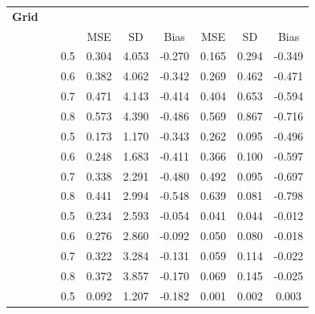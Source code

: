 \documentclass{article}[11pt]
\begin{document}
\begin{table}[ht!]
\centering
{\linespread{1.0}\small\selectfont
\setlength{\tabcolsep}{4.5pt}
\begin{tabular}{l c c ccc ccc}
    \toprule
    \textbf{Grid} & \textbf{} & \textbf{} &  &  \\
    \cmidrule(lr){4-6} \cmidrule(lr){7-9}
    & & & MSE & SD & Bias & MSE & SD & Bias \\
    \midrule
     &  & 0.5 & 0.304 & 4.053 & -0.270 & 0.165 & 0.294 & -0.349 \\
    & & 0.6 & 0.382 & 4.062 & -0.342 & 0.269 & 0.462 & -0.471 \\
    & & 0.7 & 0.471 & 4.143 & -0.414 & 0.404 & 0.653 & -0.594 \\
    & & 0.8 & 0.573 & 4.390 & -0.486 & 0.569 & 0.867 & -0.716 \\
    \cmidrule(lr){2-9}
    &  & 0.5 & 0.173 & 1.170 & -0.343 & 0.262 & 0.095 & -0.496 \\
    & & 0.6 & 0.248 & 1.683 & -0.411 & 0.366 & 0.100 & -0.597 \\
    & & 0.7 & 0.338 & 2.291 & -0.480 & 0.492 & 0.095 & -0.697 \\
    & & 0.8 & 0.441 & 2.994 & -0.548 & 0.639 & 0.081 & -0.798 \\
    \midrule
     &  & 0.5 & 0.234 & 2.593 & -0.054 & 0.041 & 0.044 & -0.012 \\
    & & 0.6 & 0.276 & 2.860 & -0.092 & 0.050 & 0.080 & -0.018 \\
    & & 0.7 & 0.322 & 3.284 & -0.131 & 0.059 & 0.114 & -0.022 \\
    & & 0.8 & 0.372 & 3.857 & -0.170 & 0.069 & 0.145 & -0.025 \\
    \cmidrule(lr){2-9}
    &  & 0.5 & 0.092 & 1.207 & -0.182 & 0.001 & 0.002 & 0.003 \\

\end{tabular}}
\end{table}
\end{document}
